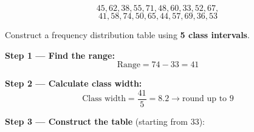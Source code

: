 \documentclass[
  12pt,
  letterpaper,
]{book}
\begin{document}
\[45, 62, 38, 55, 71, 48, 60, 33, 52, 67,\]
\[41, 58, 74, 50, 65, 44, 57, 69, 36, 53\]

Construct a frequency distribution table using \textbf{5 class
intervals}.

\begin{tcolorbox}[enhanced jigsaw, arc=.35mm, bottomrule=.15mm, bottomtitle=1mm, breakable, colback=white, colbacktitle=quarto-callout-tip-color!10!white, colframe=quarto-callout-tip-color-frame, coltitle=black, left=2mm, leftrule=.75mm, opacityback=0, opacitybacktitle=0.6, rightrule=.15mm, title={✅ Solution}, titlerule=0mm, toprule=.15mm, toptitle=1mm]

\textbf{Step 1 --- Find the range:} \[\text{Range} = 74 - 33 = 41\]

\textbf{Step 2 --- Calculate class width:}
\[\text{Class width} = \frac{41}{5} = 8.2 \rightarrow \text{round up to } 9\]

\textbf{Step 3 --- Construct the table} (starting from 33):


\end{tcolorbox}
\end{document}
